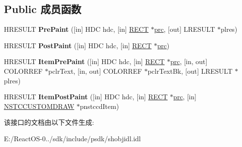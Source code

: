 \subsection*{Public 成员函数}
\begin{DoxyCompactItemize}
\item 
\mbox{\label{interface_i_name_space_tree_control_custom_draw_a8d127a017ed486fb037d4d9619594c63}} 
H\+R\+E\+S\+U\+LT {\bfseries Pre\+Paint} (\mbox{[}in\mbox{]} H\+DC hdc, \mbox{[}in\mbox{]} \hyperlink{structtag_r_e_c_t}{R\+E\+CT} $\ast$\hyperlink{structtag_r_e_c_t}{prc}, \mbox{[}out\mbox{]} L\+R\+E\+S\+U\+LT $\ast$plres)
\item 
\mbox{\label{interface_i_name_space_tree_control_custom_draw_af991641181b49728d9d86b457782841c}} 
H\+R\+E\+S\+U\+LT {\bfseries Post\+Paint} (\mbox{[}in\mbox{]} H\+DC hdc, \mbox{[}in\mbox{]} \hyperlink{structtag_r_e_c_t}{R\+E\+CT} $\ast$\hyperlink{structtag_r_e_c_t}{prc})
\item 
\mbox{\label{interface_i_name_space_tree_control_custom_draw_acd3f4fd5179c2cd9b2dd62bd786f8a04}} 
H\+R\+E\+S\+U\+LT {\bfseries Item\+Pre\+Paint} (\mbox{[}in\mbox{]} H\+DC hdc, \mbox{[}in\mbox{]} \hyperlink{structtag_r_e_c_t}{R\+E\+CT} $\ast$\hyperlink{structtag_r_e_c_t}{prc}, \mbox{[}in, out\mbox{]} C\+O\+L\+O\+R\+R\+EF $\ast$pclr\+Text, \mbox{[}in, out\mbox{]} C\+O\+L\+O\+R\+R\+EF $\ast$pclr\+Text\+Bk, \mbox{[}out\mbox{]} L\+R\+E\+S\+U\+LT $\ast$plres)
\item 
\mbox{\label{interface_i_name_space_tree_control_custom_draw_a49d77ab0522afb722e0c511a9a06e65d}} 
H\+R\+E\+S\+U\+LT {\bfseries Item\+Post\+Paint} (\mbox{[}in\mbox{]} H\+DC hdc, \mbox{[}in\mbox{]} \hyperlink{structtag_r_e_c_t}{R\+E\+CT} $\ast$\hyperlink{structtag_r_e_c_t}{prc}, \mbox{[}in\mbox{]} \hyperlink{struct_i_name_space_tree_control_custom_draw_1_1_n_s_t_c_c_u_s_t_o_m_d_r_a_w}{N\+S\+T\+C\+C\+U\+S\+T\+O\+M\+D\+R\+AW} $\ast$pnstccd\+Item)
\end{DoxyCompactItemize}


该接口的文档由以下文件生成\+:\begin{DoxyCompactItemize}
\item 
E\+:/\+React\+O\+S-\/0../sdk/include/psdk/shobjidl.\+idl\end{DoxyCompactItemize}
